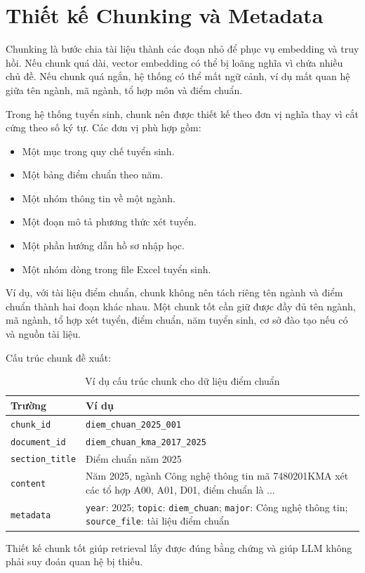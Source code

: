 \section{Thiết kế Chunking và Metadata}

Chunking là bước chia tài liệu thành các đoạn nhỏ để phục vụ embedding và truy hồi. Nếu chunk quá dài, vector embedding có thể bị loãng nghĩa vì chứa nhiều chủ đề. Nếu chunk quá ngắn, hệ thống có thể mất ngữ cảnh, ví dụ mất quan hệ giữa tên ngành, mã ngành, tổ hợp môn và điểm chuẩn.

Trong hệ thống tuyển sinh, chunk nên được thiết kế theo đơn vị nghĩa thay vì cắt cứng theo số ký tự. Các đơn vị phù hợp gồm:

\begin{itemize}
    \item Một mục trong quy chế tuyển sinh.
    \item Một bảng điểm chuẩn theo năm.
    \item Một nhóm thông tin về một ngành.
    \item Một đoạn mô tả phương thức xét tuyển.
    \item Một phần hướng dẫn hồ sơ nhập học.
    \item Một nhóm dòng trong file Excel tuyển sinh.
\end{itemize}

Ví dụ, với tài liệu điểm chuẩn, chunk không nên tách riêng tên ngành và điểm chuẩn thành hai đoạn khác nhau. Một chunk tốt cần giữ được đầy đủ tên ngành, mã ngành, tổ hợp xét tuyển, điểm chuẩn, năm tuyển sinh, cơ sở đào tạo nếu có và nguồn tài liệu.

Cấu trúc chunk đề xuất:

\begin{table}[H]
\centering
\begin{tabular}{|p{3.8cm}|p{9cm}|}
\hline
\textbf{Trường} & \textbf{Ví dụ} \\
\hline
\texttt{chunk\_id} & \texttt{diem\_chuan\_2025\_001} \\
\hline
\texttt{document\_id} & \texttt{diem\_chuan\_kma\_2017\_2025} \\
\hline
\texttt{section\_title} & Điểm chuẩn năm 2025 \\
\hline
\texttt{content} & Năm 2025, ngành Công nghệ thông tin mã 7480201KMA xét các tổ hợp A00, A01, D01, điểm chuẩn là ... \\
\hline
\texttt{metadata} & \texttt{year}: 2025; \texttt{topic}: \texttt{diem\_chuan}; \texttt{major}: Công nghệ thông tin; \texttt{source\_file}: tài liệu điểm chuẩn \\
\hline
\end{tabular}
\caption{Ví dụ cấu trúc chunk cho dữ liệu điểm chuẩn}
\label{tab:rag-chunk-structure}
\end{table}

Thiết kế chunk tốt giúp retrieval lấy được đúng bằng chứng và giúp LLM không phải suy đoán quan hệ bị thiếu.
